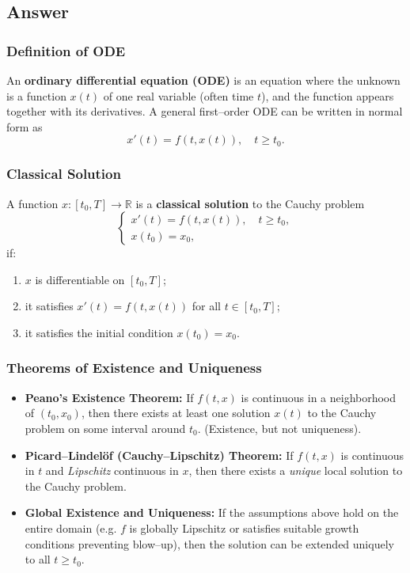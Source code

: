 \documentclass[12pt,a4paper]{book}
\theoremstyle{remark}
\newcommand{\RR}{\mathbb{R}}
\begin{document}
\subsection*{Answer}

\subsubsection*{Definition of ODE}
An \textbf{ordinary differential equation (ODE)} is an equation where the unknown is a function $x(t)$ of one real variable (often time $t$), and the function appears together with its derivatives.  
A general first–order ODE can be written in normal form as
\[
x'(t) = f(t,x(t)), \quad t \geq t_0.
\]

\subsubsection*{Classical Solution}
A function $x:[t_0,T]\to\RR$ is a \textbf{classical solution} to the Cauchy problem
\[
\begin{cases}
x'(t) = f(t,x(t)), \quad t \geq t_0, \\
x(t_0) = x_0,
\end{cases}
\]
if:
\begin{enumerate}[label=\roman*)]
    \item $x$ is differentiable on $[t_0,T]$;
    \item it satisfies $x'(t) = f(t,x(t))$ for all $t \in [t_0,T]$;
    \item it satisfies the initial condition $x(t_0) = x_0$.
\end{enumerate}

\subsubsection*{Theorems of Existence and Uniqueness}
\begin{itemize}
    \item \textbf{Peano’s Existence Theorem:} If $f(t,x)$ is continuous in a neighborhood of $(t_0,x_0)$, then there exists at least one solution $x(t)$ to the Cauchy problem on some interval around $t_0$. (Existence, but not uniqueness).
    
    \item \textbf{Picard–Lindelöf (Cauchy–Lipschitz) Theorem:} If $f(t,x)$ is continuous in $t$ and \emph{Lipschitz} continuous in $x$, then there exists a \emph{unique} local solution to the Cauchy problem. 
    
    \item \textbf{Global Existence and Uniqueness:} If the assumptions above hold on the entire domain (e.g. $f$ is globally Lipschitz or satisfies suitable growth conditions preventing blow–up), then the solution can be extended uniquely to all $t \geq t_0$.
\end{itemize}
\end{document}

